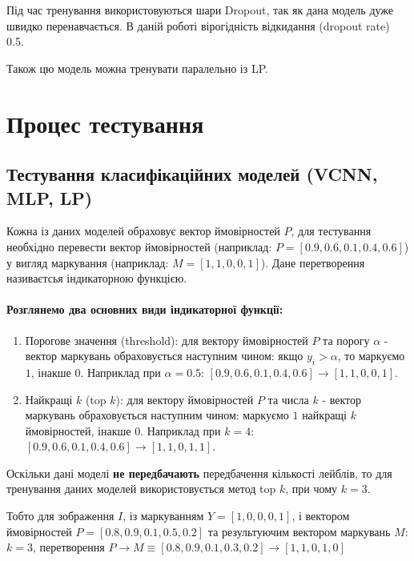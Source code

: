 \documentclass{udstu}
\begin{document}
Під час тренування використовуються шари Dropout, так як дана модель дуже швидко перенавчається.
В даній роботі вірогідність відкидання (dropout rate) 0.5.

Також цю модель можна тренувати паралельно із LP.


\section{Процес тестування}

\subsection{Тестування класифікаційних моделей (VCNN, MLP, LP)}

Кожна із даних моделей обраховує вектор ймовірностей $P$,
для тестування необхідно перевести вектор ймовірностей (наприклад: $P = [0.9, 0.6, 0.1, 0.4, 0.6]$)
у вигляд маркування (наприклад: $M = [1,1,0,0,1]$). Дане перетворення називаєтсья індикаторною функцією.

\paragraph{Розглянемо два основних види індикаторної функції:}

\begin{enumerate}[1)]
	\item Порогове значення (threshold):
	для вектору ймовірностей $P$ та порогу $\alpha$ - вектор маркувань обраховується наступним чином:
	якщо $y_i > \alpha$, то маркуємо $1$, інакше $0$.
	Наприклад при $\alpha = 0.5$: $[0.9, 0.6, 0.1, 0.4, 0.6] \to [1,1,0,0,1]$.

	\item Найкращі $k$ (top $k$):
	для вектору ймовірностей $P$ та числа $k$ - вектор маркувань обраховується наступним чином:
	маркуємо $1$ найкращі $k$ ймовірностей, інакше $0$.
	Наприклад при $k = 4$: $[0.9, 0.6, 0.1, 0.4, 0.6] \to [1,1,0,1,1]$.
\end{enumerate}

Оскільки дані моделі \textbf{не передбачають} передбачення кількості лейблів,
то для тренування даних моделей використовується метод top $k$, при чому
$k = 3$.

\label{dynk}

Тобто для зображення $I$,
із маркуванням $Y = [1,0,0,0,1]$,
і вектором ймовірностей $P = [0.8,0.9,0.1,0.5,0.2]$
та результуючим вектором маркувань $M$:
$k = 3$, перетворення $P \to M \equiv [0.8,0.9,0.1,0.3,0.2] \to [1,1,0,1,0]$
\end{document}
